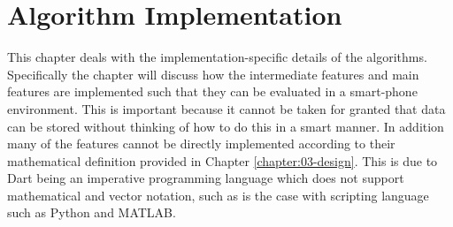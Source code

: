 \chapter{Algorithm Implementation}
This chapter deals with the implementation-specific details of the algorithms. Specifically the chapter will discuss how the intermediate features and main features are implemented such that they can be evaluated in a smart-phone environment. This is important because it cannot be taken for granted that data can be stored without thinking of how to do this in a smart manner. In addition many of the features cannot be directly implemented according to their mathematical definition provided in Chapter \ref{chapter:03-design}. This is due to Dart being an imperative programming language which does not support mathematical and vector notation, such as is the case with scripting language such as Python and MATLAB. 





